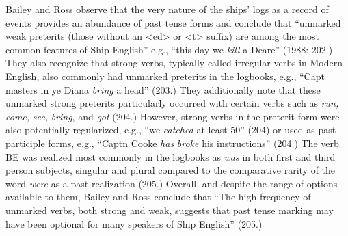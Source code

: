 Bailey and Ross observe that the very nature of the ships’ logs as a record of events provides an abundance of past tense forms and conclude that “unmarked weak preterits (those without an <ed> or <t> suffix) are among the most common features of Ship English” e.g., “this day we \textit{kill} a Deare” (1988: 202.) They also recognize that strong verbs, typically called irregular verbs in Modern English, also commonly had unmarked preterits in the logbooks, e.g., “Capt masters in ye Diana \textit{bring} a head” (203.) They additionally note that these unmarked strong preterits particularly occurred with certain verbs such as \textit{run,} \textit{come,} \textit{see,} \textit{bring}, and \textit{got} (204.) However, strong verbs in the preterit form were also potentially regularized, e.g., “we \textit{catched} at least 50” (204) or used as past participle forms, e.g., “Captn Cooke \textit{has} \textit{broke} his instructions” (204.) The verb BE was realized most commonly in the logbooks as \textit{was} in both first and third person subjects, singular and plural compared to the comparative rarity of the word \textit{were} as a past realization (205.) Overall, and despite the range of options available to them, Bailey and Ross conclude that “The high frequency of unmarked verbs, both strong and weak, suggests that past tense marking may have been optional for many speakers of Ship English” (205.) 

